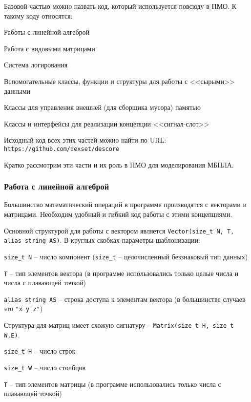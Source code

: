 Базовой частью можно назвать код, который используется повсюду в ПМО.
К такому коду относятся:

\begin{mintemize}
\item Работы с линейной алгеброй
\item Работа с видовыми матрицами
\item Система логирования
\item Вспомогательные классы, функции и структуры для работы с
    <<сырыми>> данными
\item Классы для управления внешней (для сборщика мусора) памятью
\item Классы и интерфейсы для реализации концепции <<сигнал-слот>>
\end{mintemize}

Исходный код всех этих частей можно найти по URL: \verb|https://github.com/dexset/descore|

Кратко рассмотрим эти части и их роль в ПМО для моделирования МБПЛА.

\subsubsection{Работа с линейной алгеброй}

Большинство математический операций в программе производятся с векторами и матрицами.
Необходим удобный и гибкий код работы с этими концепциями.

Основной структурой для работы с вектором является \linebreak
\verb|Vector(size_t N, T, alias string AS)|. В круглых скобках параметры шаблонизации:

\begin{mintemize}
\item \verb|size_t N| -- число компонент (\verb|size_t| -- целочисленный беззнаковый тип данных)
\item \verb|T| -- тип элементов вектора (в программе использовались только целые числа и числа с плавающей точкой)
\item \verb|alias string AS| -- строка доступа к элементам вектора (в большинстве случаев это \verb|"x y z"|)
\end{mintemize}

Структура для матриц имеет схожую сигнатуру -- \verb|Matrix(size_t H, size_t W,E)|.

\begin{mintemize}
\item \verb|size_t H| -- число строк
\item \verb|size_t W| -- число столбцов
\item \verb|T| -- тип элементов матрицы (в программе использовались только числа с плавающей точкой)
\end{mintemize}

